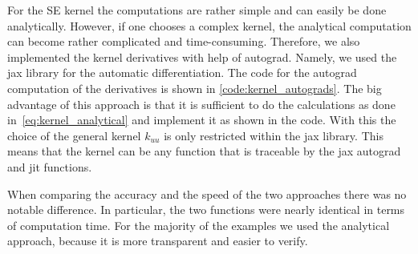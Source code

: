 \documentclass{article}
\begin{document}
For the SE kernel the computations are rather simple and can easily be done analytically. However, if one chooses a complex kernel, the analytical computation can become rather complicated and time-consuming. Therefore, we also implemented the kernel derivatives with help of autograd. Namely, we used the jax library for the automatic differentiation. The code for the autograd computation of the derivatives is shown in \ref{code:kernel_autograds}. The big advantage of this approach is that it is sufficient to do the calculations as done in~\ref{eq:kernel_analytical} and implement it as shown in the code. With this the choice of the general kernel $k_{uu}$ is only restricted within the jax library. This means that the kernel can be any function that is traceable by the jax autograd and jit functions. 

When comparing the accuracy and the speed of the two approaches there was no notable difference. In particular, the two functions were nearly identical in terms of computation time. For the majority of the examples we used the analytical approach, because it is more transparent and easier to verify.
\end{document}
